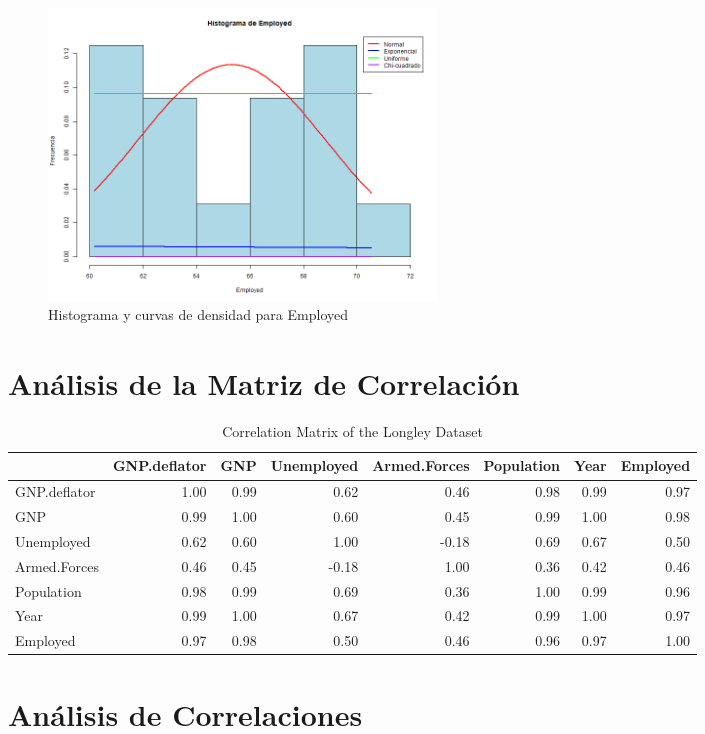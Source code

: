 \documentclass{article}
\begin{document}
\begin{figure}[H]
    \centering
    \includegraphics[width=0.5\textwidth]{HistogramasDensidad/histograma_Employed.png}
    \caption{Histograma y curvas de densidad para Employed}
    \vspace{0.5cm}
\end{figure}

\section{Análisis de la Matriz de Correlación}


\begin{table}[ht]
    \centering
    \begin{adjustbox}{max width=\textwidth}
    \begin{tabular}{lrrrrrrr}
    \hline
     & GNP.deflator & GNP & Unemployed & Armed.Forces & Population & Year & Employed \\ 
    \hline
    GNP.deflator & 1.00 & 0.99 & 0.62 & 0.46 & 0.98 & 0.99 & 0.97 \\ 
    GNP & 0.99 & 1.00 & 0.60 & 0.45 & 0.99 & 1.00 & 0.98 \\ 
    Unemployed & 0.62 & 0.60 & 1.00 & -0.18 & 0.69 & 0.67 & 0.50 \\ 
    Armed.Forces & 0.46 & 0.45 & -0.18 & 1.00 & 0.36 & 0.42 & 0.46 \\ 
    Population & 0.98 & 0.99 & 0.69 & 0.36 & 1.00 & 0.99 & 0.96 \\ 
    Year & 0.99 & 1.00 & 0.67 & 0.42 & 0.99 & 1.00 & 0.97 \\ 
    Employed & 0.97 & 0.98 & 0.50 & 0.46 & 0.96 & 0.97 & 1.00 \\ 
    \hline
    \end{tabular}
    \end{adjustbox}
    \caption{Correlation Matrix of the Longley Dataset}
    \label{tab:correlation_matrix_longley}
    \end{table}
    

    \section{Análisis de Correlaciones}
\end{document}
